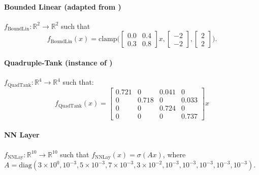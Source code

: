 \documentclass[11pt, a4paper, oneside,reqno]{amsart}
\theoremstyle{plain}
\def\realNum{{\mathbb{R}}}
\begin{document}
\paragraph{Bounded Linear (adapted from \cite{santoyo2021barrier})} $f_{\text{BoundLin}}:\realNum^2 \rightarrow \realNum^2$ such that
\begin{equation}
    f_{\text{BoundLin}}(x) = \text{clamp}\bigg( \begin{bmatrix}0.0 & 0.4 \\0.3 & 0.8\end{bmatrix}x, \begin{bmatrix}-2 \\-2\end{bmatrix}, \begin{bmatrix}2 \\2\end{bmatrix} \bigg).
\end{equation}

\paragraph{Quadruple-Tank (instance of \cite{johansson2000quadruple})} $f_{\text{QuadTank}}:\realNum^4 \rightarrow \realNum^4$ such that:
\begin{equation}
    f_{\text{QuadTank}}(x) = \begin{bmatrix}0.721 & 0 & 0.041 & 0 \\ 0 & 0.718 & 0 & 0.033 \\ 0 & 0 & 0.724 & 0 \\ 0 & 0 & 0 & 0.737 \end{bmatrix}x
\end{equation}

\paragraph{NN Layer}$f_{\text{NNLay}}:\realNum^{10} \rightarrow \realNum^{10}$ such that $
    f_{\text{NNLay}}(x) = \sigma(Ax)$,
where $A = \text{diag}(3 \times 10^0, 10^{-3}, 5 \times 10^{-3}, 7 \times 10^{-3}, 3 \times 10^{-2}, 10^{-3}, 10^{-3}, 10^{-3}, 10^{-3}, 10^{-3})$.
\end{document}
